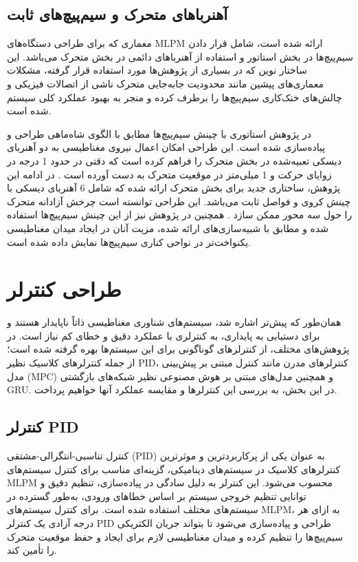 \subsection{‌آهنرباهای متحرک و سیم‌پیچ‌های ثابت}

معماری که برای طراحی دستگاه‌های MLPM ارائه شده است، شامل قرار دادن سیم‌پیچ‌ها در بخش استاتور و استفاده از آهنرباهای دائمی در بخش متحرک می‌باشد. این ساختار نوین که در بسیاری از پژوهش‌ها مورد استفاده قرار گرفته، مشکلات معماری‌های پیشین مانند محدودیت جابه‌جایی متحرک ناشی از اتصالات فیزیکی و چالش‌های خنک‌کاری سیم‌پیچ‌ها را برطرف کرده و منجر به بهبود عملکرد کلی سیستم شده است.

در پژوهش 
\cite{RN7}
استاتوری با چینش سیم‌پیچ‌ها مطابق با الگوی شاه‌ماهی
طراحی و پیاده‌سازی شده است. این طراحی امکان اعمال نیروی مغناطیسی به دو آهنربای دیسکی تعبیه‌شده در بخش متحرک را فراهم کرده است که دقتی در حدود 1 درجه در زوایای حرکت و 1 میلی‌متر در موقعیت متحرک به دست آورده است
\cite{RN7}
. در ادامه این پژوهش، ساختاری جدید برای بخش متحرک ارائه شده که شامل 6 آهنربای دیسکی با چینش کروی و فواصل ثابت می‌باشد. این طراحی توانسته است چرخش آزادانه متحرک را حول سه محور ممکن سازد 
\cite{RN39}.
همچنین در پژوهش 
\cite{RN62}
نیز از این چینش سیم‌پیچ‌ها استفاده شده و مطابق با شبیه‌سازی‌های ارائه شده، مزیت آنان در ایجاد میدان مغناطیسی یکنواخت‌تر در نواحی کناری سیم‌پیچ‌ها نمایش داده شده است.

\section{طراحی کنترلر}
همان‌طور که پیش‌تر اشاره شد، سیستم‌های شناوری مغناطیسی ذاتاً ناپایدار هستند و برای دستیابی به پایداری، به کنترلری با عملکرد دقیق و خطای کم نیاز است. در پژوهش‌های مختلف، از کنترلرهای گوناگونی برای این سیستم‌ها بهره گرفته شده است؛ از جمله کنترلرهای کلاسیک نظیر PID، کنترلرهای مدرن مانند کنترل مبتنی بر پیش‌بینی مدل (MPC) و همچنین مدل‌های مبتنی بر هوش مصنوعی نظیر شبکه‌های بازگشتی GRU. در این بخش، به بررسی این کنترلرها و مقایسه‌ عملکرد آنها خواهیم پرداخت.
\subsection{کنترلر PID}

کنترل تناسبی-انتگرالی-مشتقی (PID) به عنوان یکی از پرکاربردترین و موثرترین کنترلرهای کلاسیک در سیستم‌های دینامیکی، گزینه‌ای مناسب برای کنترل سیستم‌های MLPM محسوب می‌شود. این کنترلر به دلیل سادگی در پیاده‌سازی، تنظیم دقیق و توانایی تنظیم خروجی سیستم بر اساس خطاهای ورودی، به‌طور گسترده در سیستم‌های مختلف استفاده شده است. برای کنترل سیستم‌های MLPM، به ازای هر درجه آزادی یک کنترلر PID طراحی و پیاده‌سازی می‌شود تا بتواند جریان الکتریکی سیم‌پیچ‌ها را تنظیم کرده و میدان مغناطیسی لازم برای ایجاد و حفظ موقعیت متحرک را تأمین کند.

